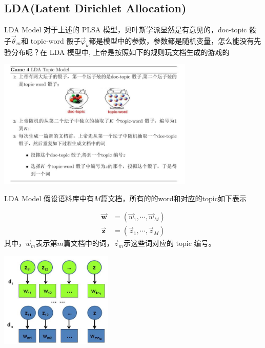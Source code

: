 \documentclass{beamer}
\begin{document}
\begin{CJK*}{UTF8}{gbsn}
\subsection{LDA(Latent Dirichlet Allocation)}
\begin{frame}{LDA Model}
对于上述的 PLSA 模型，贝叶斯学派显然是有意见的，doc-topic 骰子$\overrightarrow{\theta}_m$和 topic-word 骰子$\overrightarrow{\varphi}_k$都是模型中的参数，参数都是随机变量，怎么能没有先验分布呢？在 LDA 模型中, 上帝是按照如下的规则玩文档生成的游戏的
\begin{center}
      \includegraphics[width=0.7\textwidth]{picture/gm4.jpeg}
\end{center} 
\end{frame}


\begin{frame}{LDA Model}
假设语料库中有$M$篇文档，所有的的word和对应的topic如下表示
\begin{small}

\begin{align*}
\overrightarrow{\mathbf{w}} &= (\overrightarrow{w}_1, \cdots, \overrightarrow{w}_M) \\
\overrightarrow{\mathbf{z}} &= (\overrightarrow{z}_1, \cdots, \overrightarrow{z}_M)
\end{align*}
其中，$\overrightarrow{w}_m$表示第$m$篇文档中的词，$\overrightarrow{z}_m$示这些词对应的 topic 编号。

\begin{center}
      \includegraphics[width=0.4\textwidth]{picture/w-t.jpeg}
\end{center} 


\end{small}
\end{frame}
\end{CJK*}
\end{document}
